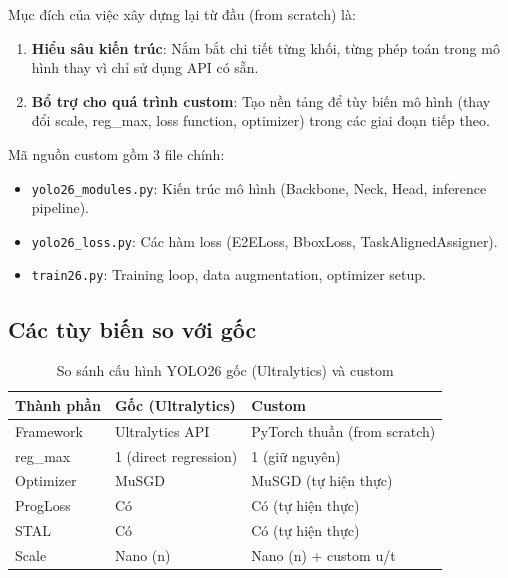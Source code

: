 Mục đích của việc xây dựng lại \yolo từ đầu (from scratch) là:
\begin{enumerate}[label=\arabic*)]
    \item \textbf{Hiểu sâu kiến trúc}: Nắm bắt chi tiết từng khối, từng phép toán trong mô hình thay vì chỉ sử dụng API có sẵn.
    \item \textbf{Bổ trợ cho quá trình custom}: Tạo nền tảng để tùy biến mô hình (thay đổi scale, reg\_max, loss function, optimizer) trong các giai đoạn tiếp theo.
\end{enumerate}

Mã nguồn custom gồm 3 file chính:
\begin{itemize}
    \item \texttt{yolo26\_modules.py}: Kiến trúc mô hình (Backbone, Neck, Head, inference pipeline).
    \item \texttt{yolo26\_loss.py}: Các hàm loss (E2ELoss, BboxLoss, TaskAlignedAssigner).
    \item \texttt{train26.py}: Training loop, data augmentation, optimizer setup.
\end{itemize}

\subsection{Các tùy biến so với gốc}

\begin{table}[H]
    \centering
    \caption{So sánh cấu hình YOLO26 gốc (Ultralytics) và custom}
    \label{tab:custom_vs_original}
    \begin{tabularx}{\textwidth}{lXX}
        \toprule
        \textbf{Thành phần} & \textbf{Gốc (Ultralytics)} & \textbf{Custom} \\
        \midrule
        Framework     & Ultralytics API & PyTorch thuần (from scratch) \\
        reg\_max      & 1 (direct regression) & 1 (giữ nguyên) \\
        Optimizer     & MuSGD & MuSGD (tự hiện thực) \\
        ProgLoss      & Có & Có (tự hiện thực) \\
        STAL          & Có & Có (tự hiện thực) \\
        Scale         & Nano (n) & Nano (n) + custom u/t \\
        \bottomrule
    \end{tabularx}
\end{table}


